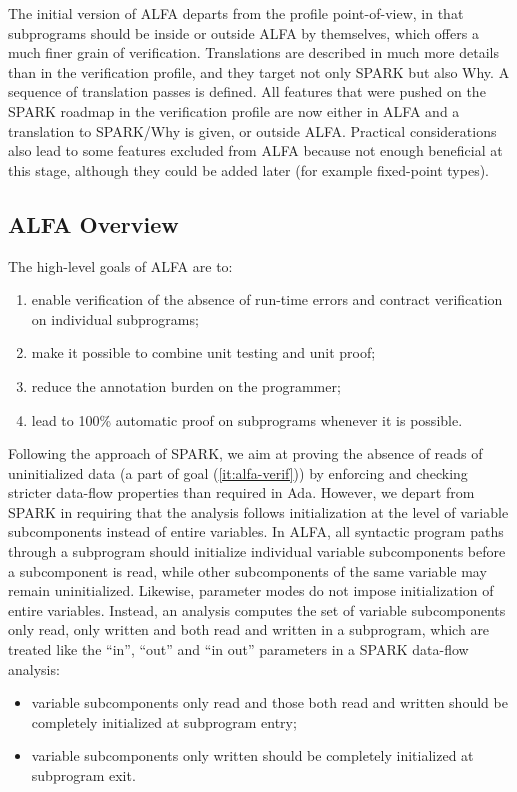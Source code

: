 \documentclass{article}
\newcounter{example}
\begin{document}
The initial version of ALFA departs from the profile point-of-view, in that
subprograms should be inside or outside ALFA by themselves, which offers a much
finer grain of verification. Translations are described in much more details
than in the verification profile, and they target not only SPARK but also
Why. A sequence of translation passes is defined. All features that were pushed
on the SPARK roadmap in the verification profile are now either in ALFA and a
translation to SPARK/Why is given, or outside ALFA. Practical considerations
also lead to some features excluded from ALFA because not enough beneficial at
this stage, although they could be added later (for example fixed-point types).

\subsection{ALFA Overview}
\label{sec:ALFA-overview}

The high-level goals of ALFA are to:
\begin{enumerate}
\item \label{it:alfa-verif} enable verification of the absence of run-time
  errors and contract verification on individual subprograms;
\item \label{it:alfa-combine} make it possible to combine unit testing and unit
  proof;
\item \label{it:alfa-annot} reduce the annotation burden on the programmer;
\item \label{it:alfa-auto} lead to 100\% automatic proof on subprograms
  whenever it is possible.
\end{enumerate}

Following the approach of SPARK, we aim at proving the absence of reads of
uninitialized data (a part of goal (\ref{it:alfa-verif})) by enforcing and
checking stricter data-flow properties than required in Ada. However, we depart
from SPARK in requiring that the analysis follows initialization at the level
of variable subcomponents instead of entire variables. In ALFA, all syntactic
program paths through a subprogram should initialize individual variable
subcomponents before a subcomponent is read, while other subcomponents of the
same variable may remain uninitialized. Likewise, parameter modes do not impose
initialization of entire variables. Instead, an analysis computes the set of
variable subcomponents only read, only written and both read and written in a
subprogram, which are treated like the ``in'', ``out'' and ``in out''
parameters in a SPARK data-flow analysis:
\begin{itemize}
\item variable subcomponents only read and those both read and written should
  be completely initialized at subprogram entry;
\item variable subcomponents only written should be completely initialized at
  subprogram exit.
\end{itemize}
\end{document}
